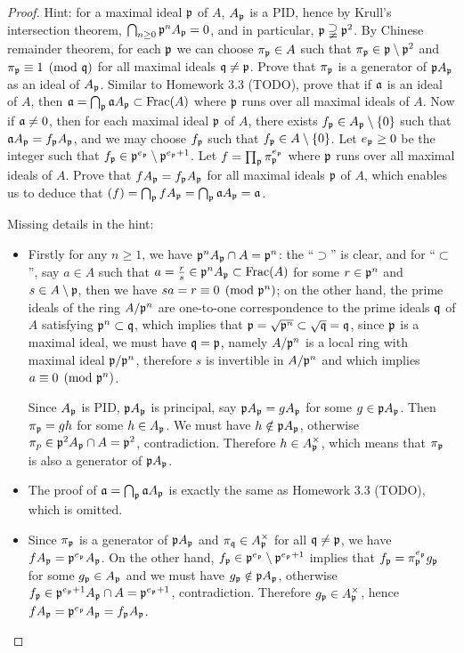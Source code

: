 \begin{proof}
Hint: for a maximal ideal
$\fp$ of $A$, $A_\fp$ is a PID, hence by Krull's intersection theorem,
$\bigcap_{n\geq 0}\fp^nA_\fp=0$,
and in particular, $\fp\supsetneqq\fp^2$. By Chinese remainder theorem,
for each $\fp$ we can choose $\pi_\fp\in A$ such that
$\pi_\fp\in\fp\setminus\fp^2$ and $\pi_\fp\equiv 1\pmod{\fq}$
for all maximal ideals $\fq\neq\fp$.
Prove that $\pi_\fp$ is a generator of $\fp A_\fp$ as an ideal of $A_\fp$.
Similar to Homework 3.3 (TODO),
prove that if $\fa$ is an ideal of $A$, then
$\fa=\bigcap_\fp\fa A_\fp\subset\Frac(A)$ where $\fp$ runs over all maximal ideals
of $A$.
Now if $\fa\neq 0$, then for each maximal ideal $\fp$ of $A$,
there exists $f_\fp\in A_\fp\setminus\{0\}$ such that $\fa A_\fp=f_\fp A_\fp$,
and we may choose $f_\fp$ such that $f_\fp\in A\setminus\{0\}$.
Let $e_\fp\geq 0$
be the integer such that $f_\fp\in\fp^{e_\fp}\setminus\fp^{e_\fp+1}$.
Let $f=\prod_\fp\pi_\fp^{e_\fp}$ where $\fp$ runs over all maximal ideals
of $A$.
Prove that $fA_\fp=f_\fp A_\fp$ for all maximal ideals $\fp$ of $A$,
which enables us to deduce that $(f)=\bigcap_\fp fA_\fp=\bigcap_\fp\fa A_\fp
=\fa$.

Missing details in the hint:
\begin{itemize}
\item
Firstly for any $n\geq 1$, we have $\fp^nA_\fp\cap A=\fp^n$: the ``$\supset$''
is clear, and for ``$\subset$'', say $a\in A$ such that
$a=\frac{r}{s}\in\fp^nA_\fp\subset\Frac(A)$ for some $r\in\fp^n$ and $s\in A\setminus\fp$,
then we have $sa=r\equiv 0\pmod{\fp^n}$;
on the other hand, the prime ideals of the ring $A/\fp^n$ are one-to-one correspondence to the prime ideals $\fq$ of $A$ satisfying $\fp^n\subset\fq$,
which implies that $\fp=\sqrt{\fp^n}\subset\sqrt\fq=\fq$, since $\fp$ is a maximal ideal,
we must have $\fq=\fp$, namely $A/\fp^n$ is a local ring with maximal ideal
$\fp/\fp^n$, therefore $s$ is invertible in $A/\fp^n$ and which implies
$a\equiv 0\pmod{\fp^n}$.

Since $A_\fp$ is PID, $\fp A_\fp$ is principal, say $\fp A_\fp=gA_\fp$
for some $g\in\fp A_\fp$.
Then $\pi_\fp=gh$ for some $h\in A_\fp$.
We must have $h\notin\fp A_\fp$, otherwise $\pi_p\in\fp^2 A_\fp\cap A=\fp^2$, contradiction. Therefore $h\in A_\fp^\times$, which means that $\pi_\fp$ is also a generator of $\fp A_\fp$.

\item
The proof of $\fa=\bigcap_\fp\fa A_\fp$ is exactly the same as
Homework 3.3 (TODO), which is omitted.

\item
Since $\pi_\fp$ is a generator of $\fp A_\fp$
and $\pi_\fq\in A_\fp^\times$ for all $\fq\neq\fp$,
we have $fA_\fp=\fp^{e_\fp}A_\fp$.
On the other hand, $f_\fp\in\fp^{e_\fp}\setminus\fp^{e_\fp+1}$ implies that
$f_\fp=\pi_\fp^{e_\fp}g_\fp$ for some $g_\fp\in A_\fp$
and we must have $g_\fp\notin\fp A_\fp$, otherwise $f_\fp\in\fp^{e_\fp+1}A_\fp\cap A=\fp^{e_\fp+1}$, contradiction. Therefore $g_\fp\in A_\fp^\times$,
hence $fA_\fp=\fp^{e_\fp}A_\fp=f_\fp A_\fp$.
\end{itemize}
\end{proof}

